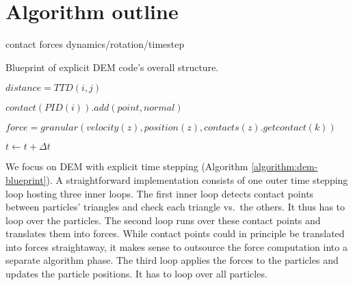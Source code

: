 \section{Algorithm outline}
\label{section:algorithm}

contact 
forces
dynamics/rotation/timestep
 
\begin{algorithm}
 
   Blueprint of explicit DEM code's overall structure.
 
 \label{algorithm:dem-blueprint}
 \begin{algorithmic}[1]
   

				
			\State $distance = TTD(i,j)$
				

				\State $contact(PID(i)).add(point, normal)$

			\EndIf
			
		\EndFor
			
	\EndFor




			\State $force = granular(velocity(z), position(z), contacts(z).getcontact(k))$

		\EndFor
	
	\EndFor    
    
     \State $t \gets t + \Delta t$
   \EndFor   

 \end{algorithmic}
\end{algorithm} 


We focus on DEM with explicit time stepping (Algorithm \ref{algorithm:dem-blueprint}). 
A straightforward implementation consists of one outer time stepping loop
hosting three inner loops. 
The first inner loop detects contact points between particles' triangles and
check each triangle vs.~the others.
It thus has to loop over the particles.
The second loop runs over these contact points and translates them into forces.
While contact points could in principle be translated into forces straightaway,
it makes sense to outsource the force computation into a separate algorithm
phase.
The third loop applies the forces to the particles and updates the particle
positions.
It has to loop over all particles.


